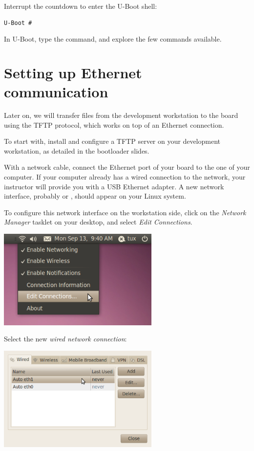 Interrupt the countdown to enter the U-Boot shell:
\begin{verbatim}
U-Boot #
\end{verbatim}

In U-Boot, type the  command, and explore the few commands
available.

\section{Setting up Ethernet communication}

Later on, we will transfer files from the development workstation to
the board using the TFTP protocol, which works on top of an Ethernet
connection.

To start with, install and configure a TFTP server on your development
workstation, as detailed in the bootloader slides.

With a network cable, connect the Ethernet port of your board to the
one of your computer. If your computer already has a wired connection
to the network, your instructor will provide you with a USB Ethernet
adapter. A new network interface, probably  or ,
should appear on your Linux system.

To configure this network interface on the workstation side, click on
the {\em Network Manager} tasklet on your desktop, and select {\em
  Edit Connections}.

\begin{center}
\includegraphics[width=8cm]{labs/sysdev-u-boot/network-config-1.png}
\end{center}

Select the new {\em wired network connection}:

\begin{center}
\includegraphics[width=8cm]{labs/sysdev-u-boot/network-config-2.png}
\end{center}


